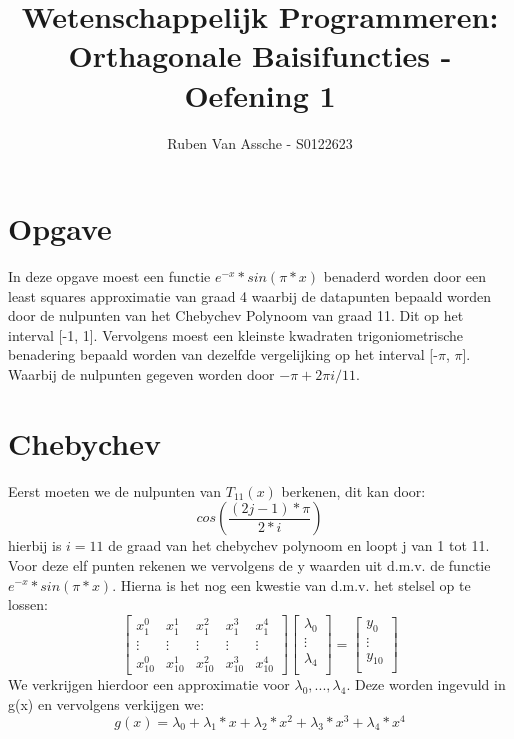 \documentclass[10pt,a4paper]{article}
\author{Ruben Van Assche - S0122623}
\title{Wetenschappelijk Programmeren: Orthagonale Baisifuncties - Oefening 1}
\begin{document}
\maketitle
\section{Opgave}
In deze opgave moest een functie $e^{-x}*sin(\pi *x)$ benaderd worden door een least squares approximatie van graad 4 waarbij de datapunten bepaald worden door de nulpunten van het Chebychev Polynoom van graad 11. Dit op het interval [-1, 1]. Vervolgens moest een kleinste kwadraten trigoniometrische benadering bepaald worden van dezelfde vergelijking op het interval [-$\pi$, $\pi$]. Waarbij de nulpunten gegeven worden door $- \pi + 2 \pi i/11$. 

\section{Chebychev}
Eerst moeten we de nulpunten van $T_{11}(x)$ berkenen, dit kan door: $$cos(\frac{(2j-1)*\pi}{2*i})$$ hierbij is $i = 11$ de graad van het chebychev polynoom en loopt j van 1 tot 11. Voor deze elf punten rekenen we vervolgens de y waarden uit d.m.v. de functie $e^{-x}*sin(\pi *x)$. 
\newline
Hierna is het nog een kwestie van d.m.v. het stelsel op te lossen: 
\newline
$$
\begin{bmatrix}
x_{1}^{0} & x_{1}^{1}  & x_{1}^{2}  & x_{1}^{3}  & x_{1}^{4}\\ 
 \vdots & \vdots  & \vdots  &\vdots   & \vdots \\ 
x_{10}^{0} &  x_{10}^{1} & x_{10}^{2}  & x_{10}^{3}  & x_{10}^{4}
\end{bmatrix}
\begin{bmatrix}
\lambda_{0}\\ 
\vdots \\
\lambda_{4}\\ 
\end{bmatrix}
=
\begin{bmatrix}
y_{0}\\ 
\vdots \\
y_{10}\\
\end{bmatrix}
$$
We verkrijgen hierdoor een approximatie voor $\lambda_{0}, ..., \lambda_{4}$. Deze worden ingevuld in g(x) en vervolgens verkijgen we:
$$g(x) = \lambda_{0} + \lambda_{1}*x + \lambda_{2}*x^{2} + \lambda_{3}*x^{3} + \lambda_{4}*x^{4}$$
\end{document}
